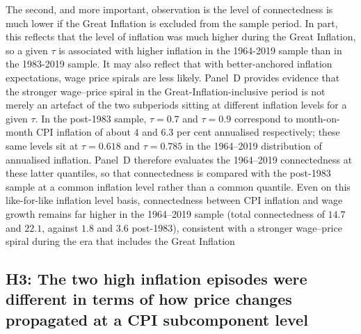 \documentclass{article}
\begin{document}
The second, and more important, observation is the level of connectedness is much lower if the Great Inflation is excluded from the sample period.  In part, this reflects that the level of inflation was much higher during the Great Inflation, so a given $\tau$ is associated with higher inflation in the 1964-2019 sample than in the 1983-2019 sample.  It may also reflect that with better-anchored inflation expectations, wage price spirals are less likely.  Panel~D provides evidence that the stronger wage--price spiral in the Great-Inflation-inclusive period is not merely an artefact of the two subperiods sitting at different inflation levels for a given $\tau$. In the post-1983 sample, $\tau=0.7$ and $\tau=0.9$ correspond to month-on-month CPI inflation of about $4$ and $6.3$ per cent annualised  respectively; these same levels sit at $\tau=0.618$ and $\tau=0.785$ in the 1964--2019 distribution of annualised inflation. Panel~D therefore evaluates the 1964--2019 connectedness at these latter quantiles, so that connectedness is compared with the post-1983 sample at a common inflation level rather than a common quantile. Even on this like-for-like inflation level basis, connectedness between CPI inflation and wage growth remains far higher in the 1964--2019 sample (total connectedness of $14.7$ and $22.1$, against $1.8$ and $3.6$ post-1983), consistent with a stronger wage--price spiral during the era that includes the Great Inflation








\subsection{H3: The two high inflation episodes were different in terms of how price changes propagated at a CPI subcomponent level }
\end{document}
